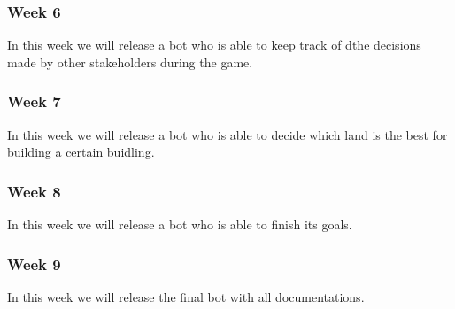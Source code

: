 \subsubsection{Week 6}
In this week we will release a bot who is able to keep track of dthe decisions made by other stakeholders during the game.

\subsubsection{Week 7}
In this week we will release a bot who is able to decide which land is the best for building a certain buidling.

\subsubsection{Week 8}
In this week we will release a bot who is able to finish its goals.

\subsubsection{Week 9}
In this week we will release the final bot with all documentations.
\newpage
